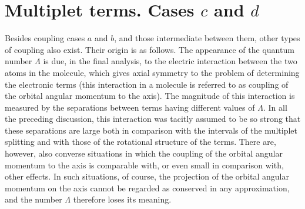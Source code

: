 \section{Multiplet terms. Cases $c$ and $d$}

Besides coupling cases $a$ and $b$, and those intermediate between them, other types of coupling also exist. Their origin is as follows. The appearance of the quantum
number $\Lambda$ is due, in the final analysis, to the electric interaction between the two atoms in the molecule, which gives axial symmetry to the problem of determining the electronic terms (this interaction in a molecule is referred to as coupling of the orbital angular momentum to the axis). The magnitude of this interaction is measured by the separations between terms having different values of $\Lambda$. In all the preceding discussion, this interaction was tacitly assumed to be so strong that these separations are large both in comparison with the intervals of the multiplet splitting and with those of the rotational structure of the terms. There are, however, also converse situations in which the coupling of the orbital angular momentum to the axis is comparable with, or even small in comparison with, other effects. In such situations, of course, the projection of the orbital angular momentum on the axis cannot be regarded as conserved in any approximation, and the number $\Lambda$ therefore loses its meaning.
